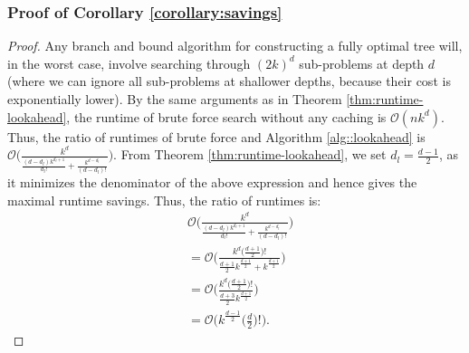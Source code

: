 \subsubsection{Proof of Corollary \ref{corollary:savings}}
\runtimesavings*
\begin{proof}
    Any branch and bound algorithm for constructing a fully optimal tree will, in the worst case, involve searching through $(2k)^d$ sub-problems at depth $d$ (where we can ignore all sub-problems at shallower depths, because their cost is exponentially lower). By the same arguments as in Theorem \ref{thm:runtime-lookahead}, the runtime of brute force search without any caching is $\mathcal{O}(nk^d)$. Thus, the ratio of runtimes of brute force and Algorithm \ref{alg::lookahead} is $\mathcal{O}\Big(\frac{k^d}{\frac{(d-d_l)k^{d_l+1}}{d_l!} + \frac{k^{d - d_l}}{(d-d_l)!}}\Big)$. From Theorem \ref{thm:runtime-lookahead}, we set $d_l = \frac{d-1}{2}$, as it minimizes the denominator of the above expression and hence gives the maximal runtime savings. Thus, the ratio of runtimes is:
    \begin{align}
        &\mathcal{O}\Big(\frac{k^d}{\frac{(d-d_l)k^{d_l+1}}{d_l!} + \frac{k^{d - d_l}}{(d-d_l)!}}\Big) \\
        &= \mathcal{O}\Big(\frac{k^d\big(\frac{d+1}{2}\big)!}{\frac{d+1}{2}k^{\frac{d+1}{2}} + k^{\frac{d+1}{2}}}\Big) \\
        &= \mathcal{O}\Big(\frac{k^d\big(\frac{d+1}{2}\big)!}{\frac{d+3}{2}k^{\frac{d+1}{2}}}\Big)\\
        &= \mathcal{O}\Big(k^{\frac{d-1}{2}}\Big(\frac{d}{2}\Big)!\Big).
    \end{align}
\end{proof}

